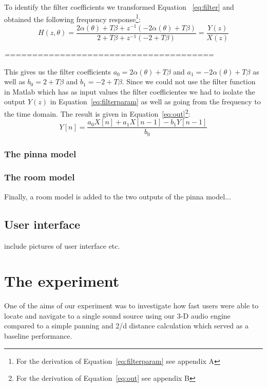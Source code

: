 \documentclass[journal]{IEEEtran}
\begin{document}
To identify the filter coefficients we transformed Equation ~\ref{eq:filter} and obtained the following frequency response\footnote{For the derivation of Equation~\ref{eq:filterparam} see appendix A}:
\begin{equation}\label{eq:filterparam}
H\left( z,\theta\right) = \frac{2\alpha (\theta)+T\beta+z^{-1}(-2\alpha(\theta)+T\beta)}{2+T\beta+z^{-1}(-2+T\beta)} = \frac{Y(z)}{X(z)}
\end{equation} 

\emph{======================================}

This gives us the filter coefficients $a_0 = 2\alpha (\theta)+T\beta$ and $a_1 = -2\alpha(\theta)+T\beta$ as well as $b_0 = 2+T\beta$ and $b_1 = -2+T\beta$. Since we could not use the filter function in Matlab which has as input values the filter coefficientes we had to isolate the output $Y(z)$ in Equation~\ref{eq:filterparam} as well as going from the frequency to the time domain. The result is given in Equation~\ref{eq:out}\footnote{For the derivation of Equation~\ref{eq:out} see appendix B}:
\begin{equation}\label{eq:out}
Y[n] =\frac{a_0X[n]+a_1X[n-1]-b_1Y[n-1]}{b_0}
\end{equation} 

\subsubsection{The pinna model}



\subsubsection{The room model}

Finally, a room model is added to the two outputs of the pinna model...





\subsection{User interface}
include pictures of user interface etc.

\section{The experiment}
One of the aims of our experiment was to investigate how fast users were able to locate and navigate to a single sound source using our 3-D audio engine compared to a simple panning and 2/d distance calculation which served as a baseline performance. 
\end{document}
